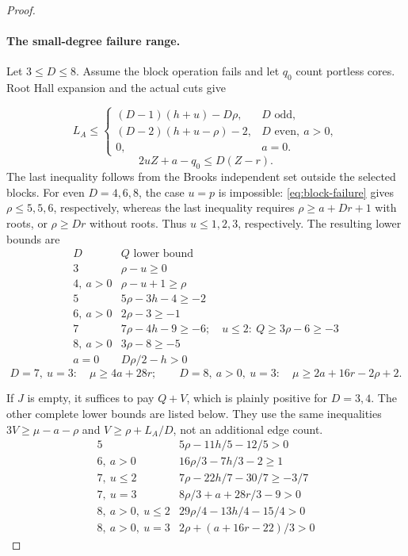 \documentclass[11pt,a4paper]{article}
\theoremstyle{definition}
\begin{document}
\begin{proof}
\paragraph{The small-degree failure range.}
Let $3\le D\le8$.
Assume the block operation fails and let $q_0$ count portless cores.
Root Hall expansion and the actual cuts give

\[
 L_A\le
 \begin{cases}
 (D-1)(h+u)-D\rho,&D\text{ odd},\\
 (D-2)(h+u-\rho)-2,&D\text{ even},\ a>0,\\
 0,&a=0.
 \end{cases}
\]
\[
 2uZ+a-q_0\le D(Z-r).
\]
The last inequality follows from the Brooks independent set outside the selected blocks.
For even $D=4,6,8$, the case $u=p$ is impossible:
\eqref{eq:block-failure} gives $\rho\le5,5,6$, respectively, whereas the last inequality requires
$\rho\ge a+Dr+1$ with roots, or $\rho\ge Dr$ without roots.
Thus $u\le1,2,3$, respectively.
The resulting lower bounds are
\begin{equation}\label{eq:nonunit-Q-small}
\begin{array}{c|c}
D&Q\text{ lower bound}\\\hline
3&\rho-u\ge0\\
4,\ a>0&\rho-u+1\ge\rho\\
5&5\rho-3h-4\ge-2\\
6,\ a>0&2\rho-3\ge-1\\
7&7\rho-4h-9\ge-6;\quad u\le2:\ Q\ge3\rho-6\ge-3\\
8,\ a>0&3\rho-8\ge-5\\
a=0&D\rho/2-h>0
\end{array}
\end{equation}
\[
D=7,\ u=3:\quad \mu\ge4a+28r;\qquad
D=8,\ a>0,\ u=3:\quad\mu\ge2a+16r-2\rho+2.
\]

If $J$ is empty, it suffices to pay $Q+V$, which is plainly positive for $D=3,4$.
The other complete lower bounds are listed below.
They use the same inequalities $3V\ge\mu-a-\rho$ and $V\ge\rho+L_A/D$, not an additional edge count.
\[
\begin{array}{c|l}
5&5\rho-11h/5-12/5>0\\
6,\ a>0&16\rho/3-7h/3-2\ge1\\
7,\ u\le2&7\rho-22h/7-30/7\ge-3/7\\
7,\ u=3&8\rho/3+a+28r/3-9>0\\
8,\ a>0,\ u\le2&29\rho/4-13h/4-15/4>0\\
8,\ a>0,\ u=3&2\rho+(a+16r-22)/3>0
\end{array}
\]


\end{proof}
\end{document}
